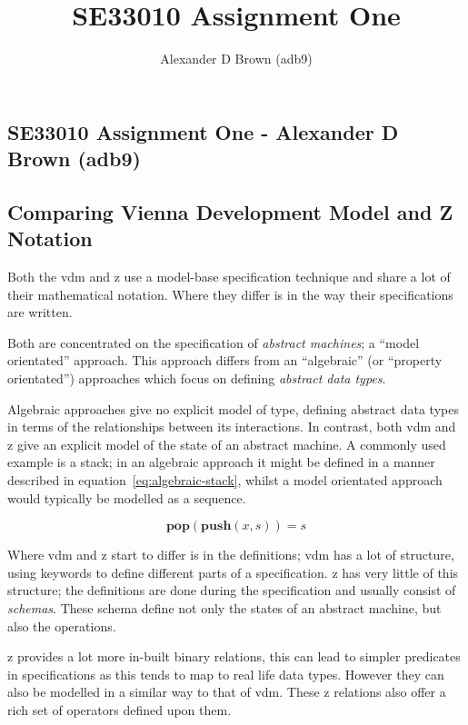 \documentclass[a4paper, notitlepage, fleqn]{article}
\title{SE33010 Assignment One}
\author{Alexander D Brown (adb9)}
\begin{document}
\begin{centering}
\section*{SE33010 Assignment One - Alexander D Brown (adb9)}
\subsection*{Comparing Vienna Development Model and Z Notation}
\end{centering}

Both the \gls{vdm} and \gls{z} use a model-base specification technique and share a lot of their 
mathematical notation. Where they differ is in the way their specifications are 
written\cite{Hayes94comparative}.

Both are concentrated on the specification of \textit{abstract machines}; a ``model orientated'' 
approach. This approach differs from an ``algebraic'' (or ``property orientated'') approaches
which focus on defining \textit{abstract data types}\cite{Hayes93vdmz}.

Algebraic approaches give no explicit model of type, defining abstract data types in terms of the 
relationships between its interactions. In contrast, both \gls{vdm} and \gls{z} give an explicit 
model of the state of an abstract machine. A commonly used example is a stack; in an algebraic 
approach it might be defined in a manner described in equation~\ref{eq:algebraic-stack}, whilst
a model orientated approach would typically be modelled as a sequence.

\begin{equation}\label{eq:algebraic-stack}
\mathbf{pop}(\mathbf{push} (x,s)) = s
\end{equation}

Where \gls{vdm} and \gls{z} start to differ is in the definitions; \gls{vdm} has a lot of 
structure, using keywords to define different parts of a specification. \Gls{z} has very little of
this structure; the definitions are done during the specification and usually consist of
\textit{schemas}. These schema define not only the states of an abstract machine, but also the 
operations.

\Gls{z} provides a lot more in-built binary relations, this can lead to simpler predicates in
specifications as this tends to map to real life data types. However they can also be modelled in
a similar way to that of \gls{vdm}. These \gls{z} relations also offer a rich set of operators
defined upon them.
\end{document}

